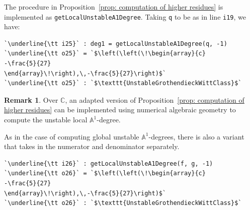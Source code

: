 \documentclass[12pt]{amsart}
\theoremstyle{definition}
\newtheorem{remark}[theorem]{Remark}
\begin{document}
The procedure in Proposition~\ref{prop: computation of higher residues} is implemented as \texttt{getLocalUnstableA1Degree}. Taking \texttt{q} to be as in line \texttt{i19}, we have:
\begin{lstlisting}[language=Macaulay2output]
`\underline{\tt i25}` : deg1 = getLocalUnstableA1Degree(q, -1)
`\underline{\tt o25}` = `$\left(\left(\!\begin{array}{c}
-\frac{5}{27}
\end{array}\!\right),\,-\frac{5}{27}\right)$`
`\underline{\tt o25}` : `$\texttt{UnstableGrothendieckWittClass}$`
\end{lstlisting}

\begin{remark}\label{rmk: local unstable over CC}
Over $\mathbb{C}$, an adapted version of Proposition~\ref{prop: computation of higher residues} can be implemented using numerical algebraic geometry to compute the unstable local $\mathbb{A}^{1}$-degree.
\end{remark}

As in the case of computing global unstable $\mathbb{A}^{1}$-degrees, there is also a variant that takes in the numerator and denominator separately. 
\begin{lstlisting}[language=Macaulay2output]
`\underline{\tt i26}` : getLocalUnstableA1Degree(f, g, -1)
`\underline{\tt o26}` = `$\left(\left(\!\begin{array}{c}
-\frac{5}{27}
\end{array}\!\right),\,-\frac{5}{27}\right)$`
`\underline{\tt o26}` : `$\texttt{UnstableGrothendieckWittClass}$`
\end{lstlisting}
\end{document}
